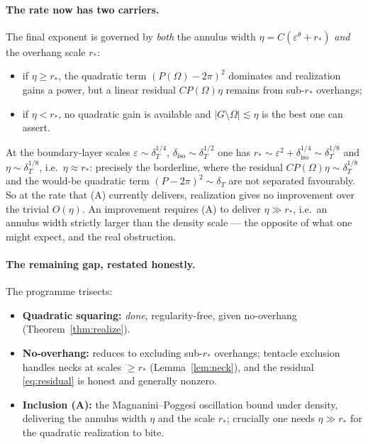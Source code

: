 \documentclass[11pt]{article}
\theoremstyle{definition}
\newcommand{\Om}{\Omega}
\newcommand{\eps}{\varepsilon}
\newcommand{\dT}{\delta_T}
\begin{document}
\paragraph{The rate now has two carriers.} The final exponent is governed
by \emph{both} the annulus width $\eta=C(\eps^\theta+r_*)$ \emph{and} the
overhang scale $r_*$:
\begin{itemize}[leftmargin=2em]
\item if $\eta\ge r_*$, the quadratic term $(P(\Om)-2\pi)^2$ dominates and
realization gains a power, but a linear residual $C P(\Om)\eta$ remains
from sub-$r_*$ overhangs;
\item if $\eta<r_*$, no quadratic gain is available and
$|G\setminus\Om|\lesssim\eta$ is the best one can assert.
\end{itemize}
At the boundary-layer scales $\eps\sim\dT^{1/4}$,
$\delta_{\mathrm{iso}}\sim\dT^{1/2}$ one has
$r_*\sim\eps^2+\delta_{\mathrm{iso}}^{1/4}\sim\dT^{1/8}$ and
$\eta\sim\dT^{1/8}$, i.e.\ $\eta\approx r_*$: precisely the borderline,
where the residual $CP(\Om)\eta\sim\dT^{1/8}$ and the would-be quadratic
term $(P-2\pi)^2\sim\dT$ are not separated favourably. So at the rate that
(A) currently delivers, realization gives no improvement over the trivial
$O(\eta)$. An improvement requires (A) to deliver $\eta\gg r_*$, i.e.\ an
annulus width strictly larger than the density scale --- the opposite of
what one might expect, and the real obstruction.

\paragraph{The remaining gap, restated honestly.} The programme trisects:
\begin{itemize}[leftmargin=2em]
\item \textbf{Quadratic squaring:} \emph{done}, regularity-free, given
no-overhang (Theorem~\ref{thm:realize}).
\item \textbf{No-overhang:} reduces to excluding sub-$r_*$ overhangs;
tentacle exclusion handles necks at scales $\ge r_*$
(Lemma~\ref{lem:neck}), and the residual \eqref{eq:residual} is honest and
generally nonzero.
\item \textbf{Inclusion (A):} the Magnanini--Poggesi oscillation bound
under density, delivering the annulus width $\eta$ and the scale $r_*$;
crucially one needs $\eta\gg r_*$ for the quadratic realization to bite.
\end{itemize}
\end{document}

